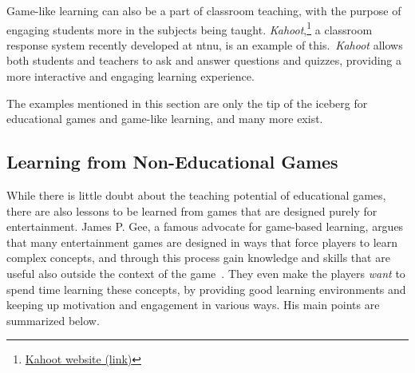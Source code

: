 \noindent
Game-like learning can also be a part of classroom teaching, with the purpose of engaging students more in the subjects being taught. \emph{Kahoot},\footnote{\href{https://getkahoot.com/}{Kahoot website (link)}} a classroom response system recently developed at \gls{ntnu}, is an example of this.~\emph{Kahoot} allows both students and teachers to ask and answer questions and quizzes, providing a more interactive and engaging learning experience.

\noindent
The examples mentioned in this section are only the tip of the iceberg for educational games and game-like learning, and many more exist.

\subsection{Learning from Non-Educational Games}
\label{sec:non_educational_games}
While there is little doubt about the teaching potential of educational games, there are also lessons to be learned from games that are designed purely for entertainment. James P. Gee, a famous advocate for game-based learning, argues that many entertainment games are designed in ways that force players to learn complex concepts, and through this process gain knowledge and skills that are useful also outside the context of the game~\cite{gee:learning_machines}. They even make the players \emph{want} to spend time learning these concepts, by providing good learning environments and keeping up motivation and engagement in various ways. His main points are summarized below.


